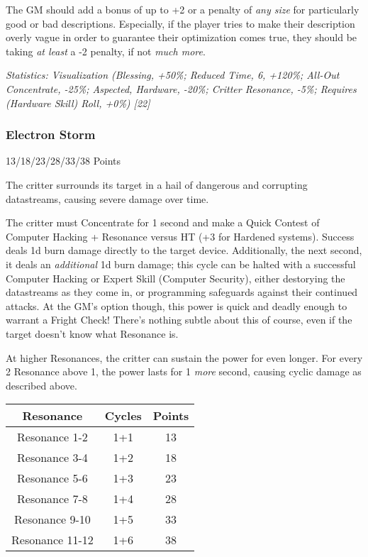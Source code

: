 \begin{multicols*}{3}
	The GM should add a bonus of up to +2 or a penalty of \textit{any size} for particularly good or bad descriptions. Especially, if the player tries to make their description overly vague in order to guarantee their optimization comes true, they should be taking \textit{at least} a -2 penalty, if not \textit{much more}.

	\textcolor{OliveGreen}{\textit{Statistics: Visualization (Blessing, +50\%; Reduced Time, 6, +120\%; All-Out Concentrate, -25\%; Aspected, Hardware, -20\%; Critter Resonance, -5\%; Requires (Hardware Skill) Roll, +0\%) [22] }}

	\subsubsection{Electron Storm}\label{electron_storm}
	\begin{flushright}
		13/18/23/28/33/38 Points
	\end{flushright}

	The critter surrounds its target in a hail of dangerous and corrupting datastreams, causing severe damage over time.
	
	The critter must Concentrate for 1 second and make a Quick Contest of Computer Hacking + Resonance versus HT (+3 for Hardened systems). Success deals 1d burn damage directly to the target device. Additionally, the next second, it deals an \textit{additional} 1d burn damage; this cycle can be halted with a successful Computer Hacking or Expert Skill (Computer Security), either destorying the datastreams as they come in, or programming safeguards against their continued attacks. At the GM's option though, this power is quick and deadly enough to warrant a Fright Check! There's nothing subtle about this of course, even if the target doesn't know what Resonance is.
	
	At higher Resonances, the critter can sustain the power for even longer. For every 2 Resonance above 1, the power lasts for 1 \textit{more} second, causing cyclic damage as described above.
	
	 	\begin{center}
	 	\begin{tabular}{|c|c|c|}
	 		\hline
	 		Resonance & Cycles & Points \\
	 		\hline
	 		\hline
	 		Resonance 1-2 & 1+1 & 13 \\
	 		Resonance 3-4 & 1+2 & 18 \\
	 		Resonance 5-6 & 1+3 & 23 \\
	 		Resonance 7-8 & 1+4 & 28 \\
	 		Resonance 9-10 & 1+5 & 33 \\
	 		Resonance 11-12 & 1+6 & 38 \\
	 		\hline
	 	\end{tabular}
	 \end{center}


\end{multicols*}
